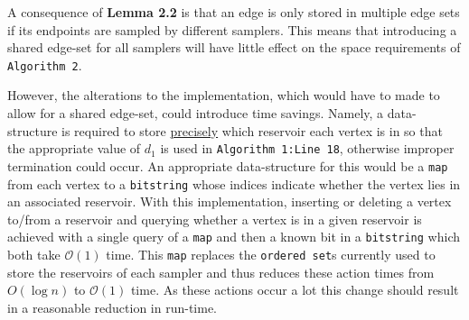 \documentclass[11pt,twoside,a4paper]{report}
\begin{document}

\par A consequence of \textbf{Lemma 2.2} is that an edge is only stored in multiple edge sets if its endpoints are sampled by different samplers. %
This means that introducing a shared edge-set for all samplers will have little effect on the space requirements of \texttt{Algorithm 2}.
\par However, the alterations to the implementation, which would have to made to allow for a shared edge-set, could introduce time savings. Namely, a data-structure is required to store \underline{precisely} which reservoir each vertex is in so that the appropriate value of $d_1$ is used in \texttt{Algorithm 1:Line 18}, otherwise improper termination could occur. An appropriate data-structure for this would be a \texttt{map} from each vertex to a \texttt{bitstring} whose indices indicate whether the vertex lies in an associated reservoir. With this implementation, inserting or deleting a vertex to/from a reservoir and querying whether a vertex is in a given reservoir is achieved with a single query of a \texttt{map} and then a known bit in a \texttt{bitstring} which both take $\mathcal{O}(1)$ time. This \texttt{map} replaces the \texttt{ordered set}s currently used to store the reservoirs of each sampler and thus reduces these action times from $O(\log n)$ to $\mathcal{O}(1)$ time. As these actions occur a lot this change should result in a reasonable reduction in run-time. %
\end{document}
